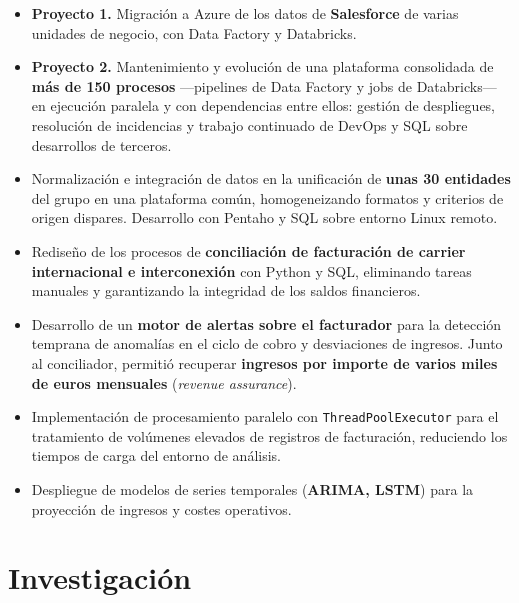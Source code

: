 \documentclass[10pt]{article}
\begin{document}
\begin{itemize}
    \item \textbf{Proyecto 1.} Migración a Azure de los datos de \textbf{Salesforce} de varias unidades de negocio, con Data Factory y Databricks.
    \item \textbf{Proyecto 2.} Mantenimiento y evolución de una plataforma consolidada de \textbf{más de 150 procesos} —pipelines de Data Factory y jobs de Databricks— en ejecución paralela y con dependencias entre ellos: gestión de despliegues, resolución de incidencias y trabajo continuado de DevOps y SQL sobre desarrollos de terceros.
\end{itemize}

\begin{itemize}
    \item Normalización e integración de datos en la unificación de \textbf{unas 30 entidades} del grupo en una plataforma común, homogeneizando formatos y criterios de origen dispares. Desarrollo con Pentaho y SQL sobre entorno Linux remoto.
\end{itemize}

\vspace{0.3cm}
\begin{itemize}
    \item Rediseño de los procesos de \textbf{conciliación de facturación de carrier internacional e interconexión} con Python y SQL, eliminando tareas manuales y garantizando la integridad de los saldos financieros.
    \item Desarrollo de un \textbf{motor de alertas sobre el facturador} para la detección temprana de anomalías en el ciclo de cobro y desviaciones de ingresos. Junto al conciliador, permitió recuperar \textbf{ingresos por importe de varios miles de euros mensuales} (\textit{revenue assurance}).
    \item Implementación de procesamiento paralelo con \verb|ThreadPoolExecutor| para el tratamiento de volúmenes elevados de registros de facturación, reduciendo los tiempos de carga del entorno de análisis.
    \item Despliegue de modelos de series temporales (\textbf{ARIMA, LSTM}) para la proyección de ingresos y costes operativos.
\end{itemize}

\section{Investigación}
\end{document}

